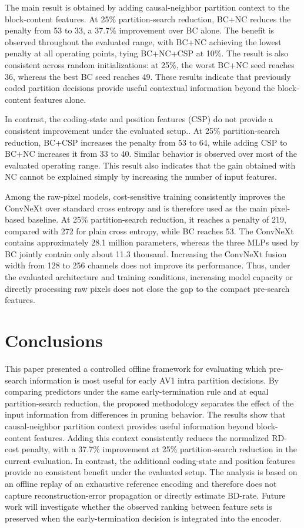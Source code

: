 \documentclass{article}
\begin{document}
The main result is obtained by adding causal-neighbor partition context to the block-content features. At 25\% partition-search reduction, BC+NC reduces the penalty from 53 to 33, a 37.7\% improvement over BC alone. The benefit is observed throughout the evaluated range, with BC+NC achieving the lowest penalty at all operating points, tying BC+NC+CSP at 10\%. The result is also consistent across random initializations: at 25\%, the worst BC+NC seed reaches 36, whereas the best BC seed reaches 49. These results indicate that previously coded partition decisions provide useful contextual information beyond the block-content features alone.

In contrast, the coding-state and position features (CSP) do not provide
a consistent improvement under the evaluated setup.. At 25\% partition-search reduction, BC+CSP increases the penalty from 53 to 64, while adding CSP to BC+NC increases it from 33 to 40. Similar behavior is observed over most of the evaluated operating range. This result also indicates that the gain obtained with NC cannot be explained simply by increasing the number of input features.

Among the raw-pixel models, cost-sensitive training consistently improves the ConvNeXt over standard cross entropy and is therefore used as the main pixel-based baseline. At 25\% partition-search reduction, it reaches a penalty of 219, compared with 272 for plain cross entropy, while BC reaches 53. The ConvNeXt contains approximately 28.1 million parameters, whereas the three MLPs used by BC jointly contain only about 11.3 thousand. Increasing the ConvNeXt fusion width from 128 to 256 channels does not improve its performance. Thus, under the evaluated architecture and training conditions, increasing model capacity or directly processing raw pixels does not close the gap to the compact pre-search features.



\section{Conclusions}
\label{sec:conclusions}

This paper presented a controlled offline framework for evaluating which pre-search information is most useful for early AV1 intra partition decisions. By comparing predictors under the same early-termination rule and at equal partition-search reduction, the proposed methodology separates the effect of the input information from differences in pruning behavior.
The results show that causal-neighbor partition context provides useful information beyond block-content features. 
Adding this context consistently reduces the normalized RD-cost penalty, with a 37.7\% improvement at 25\% partition-search reduction in the current evaluation. In contrast, the additional coding-state and position features provide no consistent benefit under the evaluated setup.
The analysis is based on an offline replay of an exhaustive reference encoding and therefore does not capture reconstruction-error propagation or directly estimate BD-rate. Future work will investigate whether the observed ranking between feature sets is preserved when the early-termination decision is integrated into the encoder.
\end{document}
